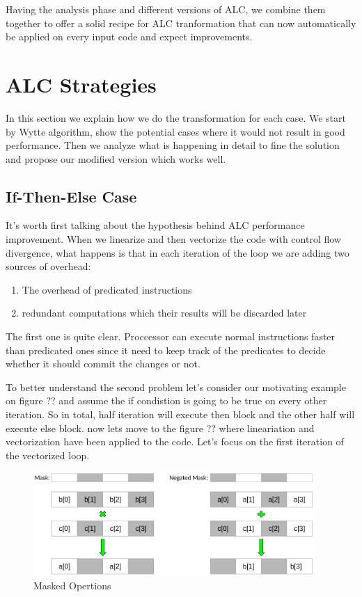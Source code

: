 \documentclass[\main/thesis.tex]{subfiles}
\begin{document}
Having the analysis phase and different versions of ALC, we combine them together to offer a solid recipe for ALC tranformation that can now automatically be applied on every input code and expect improvements.


\section{ALC Strategies}

In this section we explain how we do the transformation for each case. We start by Wytte algorithm, show the potential cases where it would not result in good performance. Then we analyze what is happening in detail to fine the solution and propose our modified version which works well.

\subsection{If-Then-Else Case}
It's worth first talking about the hypothesis behind ALC performance improvement. When we linearize and then vectorize the code with control flow divergence, what happens is that in each iteration of the loop we are adding two sources of overhead:
\begin{enumerate}
    \item The overhead of predicated instructions
    \item redundant computations which their results will be discarded later 
\end{enumerate}

The first one is quite clear. Proccessor can execute normal instructions faster than predicated ones since it need to keep track of the predicates to decide whether it should commit the changes or not.

To better understand the second problem let's consider our motivating example on figure ?? and assume the if condistion is going to be true on every other iteration. So in total, half iteration will execute then block and the other half will execute else block.
now lets move to the figure ?? where lineariation and vectorization have been applied to the code. Let's focus on the first iteration of the vectorized loop.


\begin{figure}[t!]
    \centering
    \includegraphics[width=0.95\textwidth]{img/masked_operations.png}
    \caption{Masked Opertions}
    \label{fig:masked_multiplication}
\end{figure}
\end{document}
